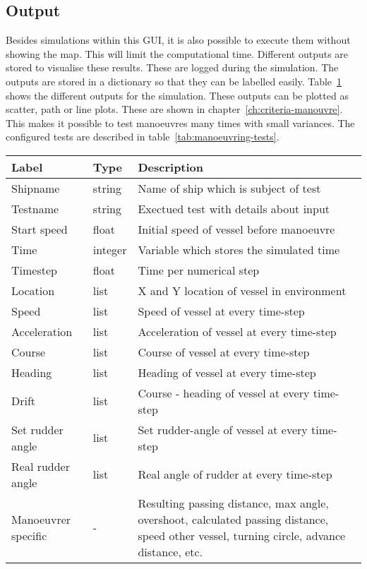 \subsection{Output}
Besides simulations within this GUI, it is also possible to execute them without showing the map. This will limit the computational time. 
Different outputs are stored to visualise these results. These are logged during the simulation. The outputs are stored in a dictionary so that they can be labelled easily. Table~\ref{tab:output-manoeuvers} shows the different outputs for the simulation. These outputs can be plotted as scatter, path or line plots. These are shown in chapter~\ref{ch:criteria-manouvre}.
This makes it possible to test manoeuvres many times with small variances. The configured tests are described in table~\ref{tab:manoeuvring-tests}.

\begin{table}[p]
	\centering
	\begin{tabular}{p{}|p{}|p{}}
		\toprule
		Label & Type & Description \\
		\midrule
		Shipname & string & Name of ship which is subject of test \\
		Testname & string & Exectued test with details about input \\
		Start speed & float & Initial speed of vessel before manoeuvre \\
		Time & integer & Variable which stores the simulated time \\
		Timestep & float & Time per numerical step \\
		Location & list & X and Y location of vessel in environment \\
		Speed & list & Speed of vessel at every time-step \\
		Acceleration & list & Acceleration of vessel at every time-step \\
		Course & list & Course of vessel at every time-step \\
		Heading & list & Heading of vessel at every time-step \\
		Drift & list & Course - heading of vessel at every time-step \\
		Set rudder angle & list & Set rudder-angle of vessel at every time-step \\
		Real rudder angle & list & Real angle of rudder at every time-step \\
		Manoeuvrer specific & - & Resulting passing distance, max angle, overshoot, calculated passing distance, speed other vessel, turning circle, advance distance, etc.\\
		\bottomrule
	\end{tabular}
	
	\label{tab:output-manoeuvers}
\end{table}

